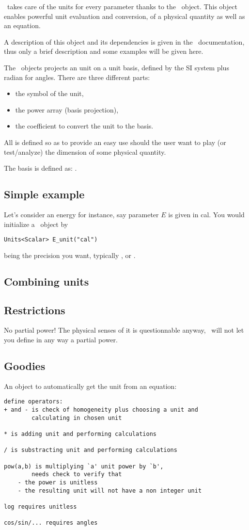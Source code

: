 \Antioch\ takes care of the units for every
parameter thanks to the \Units\ object. This object
enables powerful unit evaluation and conversion,
of a physical quantity as well as an equation.

A description of this object and its dependencies is
given in the \Doxygen\ documentation, thus only a
brief description and some examples will be given here.

The \Units\ objects projects an unit on a unit basis,
defined by the SI system plus radian for angles. There are
three different parts:
\begin{itemize}
\item the symbol of the unit,
\item the power array (basis projection),
\item the coefficient to convert the unit to the basis.
\end{itemize}

All is defined so as to provide an easy use should the user
want to play (or test/analyze) the dimension of some physical
quantity.

The basis is defined as: \unitbase.

\subsection{Simple example}

Let's consider an energy for instance, say parameter
$E$ is given in \unit{cal}. You would initialize a \Units\
object by 
\begin{verbatim}
Units<Scalar> E_unit("cal")
\end{verbatim}
 being the precision you want, typically ,
\prog{double} or \prog{long double}.

\subsection{Combining units}
\subsection{Restrictions}
No partial power! The physical senses of it is questionnable
anyway, \Antioch\ will not let you define in any way
a partial power.
\subsection{Goodies}
An object to automatically get the unit
from an equation:
\begin{verbatim}
define operators:
+ and - is check of homogeneity plus choosing a unit and
        calculating in chosen unit

* is adding unit and performing calculations

/ is substracting unit and performing calculations

pow(a,b) is multiplying `a' unit power by `b',
        needs check to verify that
    - the power is unitless
    - the resulting unit will not have a non integer unit

log requires unitless

cos/sin/... requires angles
\end{verbatim}
